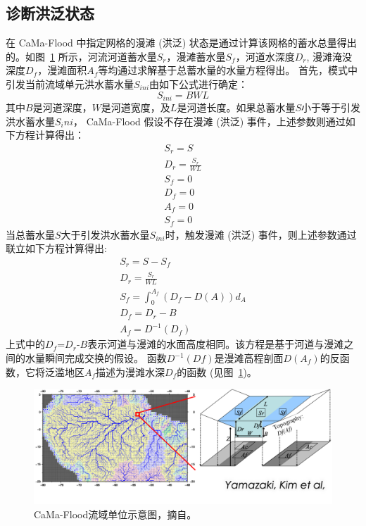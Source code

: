 \subsection{诊断洪泛状态}\label{诊断洪泛状态}
在 CaMa-Flood 中指定网格的漫滩 (洪泛) 状态是通过计算该网格的蓄水总量得出的。如图~\ref{fig:CaMa-Flood流域单位示意图}
所示，河流河道蓄水量$S_r$，漫滩蓄水量$S_f$，河道水深度$D_r$, 漫滩淹没深度$D_f$，漫滩面积$A_f$等均通过求解基于总蓄水量的水量方程得出。
首先，模式中引发当前流域单元洪水蓄水量$S_{ini}$由如下公式进行确定：
\begin{equation}
S_{ ini }=B WL
\end{equation}
其中$B$是河道深度，$W$是河道宽度，及$L$是河道长度。如果总蓄水量$S$小于等于引发洪水蓄水量$S_ini$，
CaMa-Flood 假设不存在漫滩 (洪泛) 事件，上述参数则通过如下方程计算得出：
\begin{equation}
    \begin{array}{l}S_r=S \\ D_r=\frac{S_r}{WL} \\ S_f=0 \\ D_f=0 \\ A_f=0 \\ S_f=0\end{array}
\end{equation}
当总蓄水量$S$大于引发洪水蓄水量$S_{ini}$时，触发漫滩 (洪泛) 事件，则上述参数通过联立如下方程计算得出:
\begin{equation}
\begin{array}{l}S_r=S-S_f \\ D_r=\frac{S_r}{W L} \\ S_f=\int_{0}^{A_f}(D_f-D(A)) d_A \\ D_f=D_r-B \\ A_f=D^{-1}(D_f)\end{array}
\end{equation}
上式中的$D_f$=$D_r$-$B$表示河道与漫滩的水面高度相同。该方程是基于河道与漫滩之间的水量瞬间完成交换的假设。
函数$D^{-1}(Df)$是漫滩高程剖面$D(A_f)$的反函数，它将泛滥地区$A_f$描述为漫滩水深$D_f$的函数 (见图~\ref{fig:CaMa-Flood流域单位示意图})。


{
\begin{figure}[]
\centering
\includegraphics{Figures/陆地表面的水分循环/CaMa-Flood流域单位示意图.png}
\caption{CaMa-Flood流域单位示意图，摘自\citet{yamazaki2011physically}。 }
\label{fig:CaMa-Flood流域单位示意图}
\end{figure}
}

